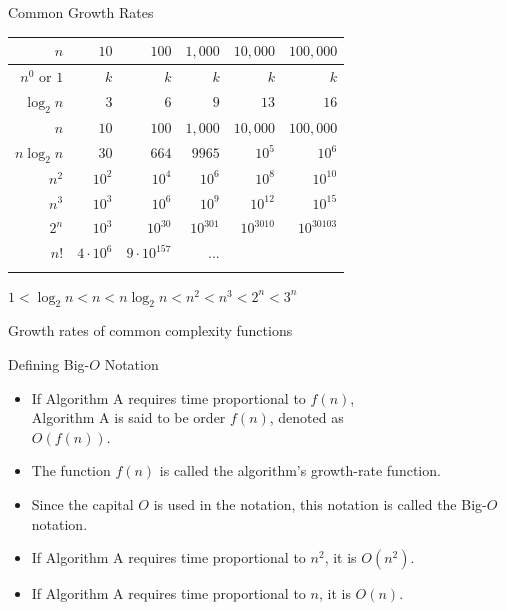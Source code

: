 \documentclass[14pt,aspectratio=1610, hyperref={pdfpagelayout=SinglePage}]{beamer}
\begin{document}
\begin{frame}{Common Growth Rates}

\begin{tabular}{r r r r r r}
  \toprule{}
      \(n\)      & \(10\)   & \(100\)  & \(1,000\) & \(10,000\) & \(100,000\) \\
  \midrule{}
\(n^0\) or \(1\)  & \(k\)      & \(k\)      & \(k\)      & \(k\)      & \(k\) \\
\(\log_2n\)   & \(3\)      & \(6\)      & \(9\)      & \(13\)      & \(16\) \\
\(n\)        & \(10\)     & \(100\)    & \(1,000\)   & \(10,000\)   & \(100,000\) \\
\(n\log_2n\) & \(30\)     & \(664\)    & \(9965\)   & \(10^5\)  & \(10^6\) \\
\(n^2\)      & \(10^2\) & \(10^4\) & \(10^6\) & \(10^8\)  & \(10^{10}\) \\
\(n^3\)      & \(10^3\) & \(10^6\) & \(10^9\) & \(10^{12}\)  & \(10^{15}\) \\
\(2^n\)      & \(10^3\) & \(10^{30}\) & \(10^{301}\) & \(10^{3010}\)  & \(10^{30103}\)\\
\(n!\)       & \(4 \cdot 10^6\) & \(9 \cdot 10^{157}\) & ...\\
\bottomrule{}
\end{tabular}

\(1 < \log_2n < n < n\log_2n < n^2 < n^3 < 2^n < 3^n\)

\end{frame}

\begin{frame}{Growth rates of common complexity functions}
  
\end{frame}


\begin{frame}{Defining Big-\(O\) Notation}
\begin{itemize}
\item If  Algorithm A requires time proportional to \(f(n)\),\\ Algorithm A is said to be order \(f(n)\), denoted as\\ \(O(f(n))\).
\item The function \(f(n)\) is called the algorithm's growth-rate function.
\item Since the capital \(O\) is used in the notation,  this notation is called the Big-\(O\) notation.
\item If Algorithm A requires time proportional to \(n^2\), it is \(O(n^2)\).
\item If Algorithm A requires time proportional to \(n\), it is \(O(n)\).
\end{itemize}
\end{frame}
\end{document}
